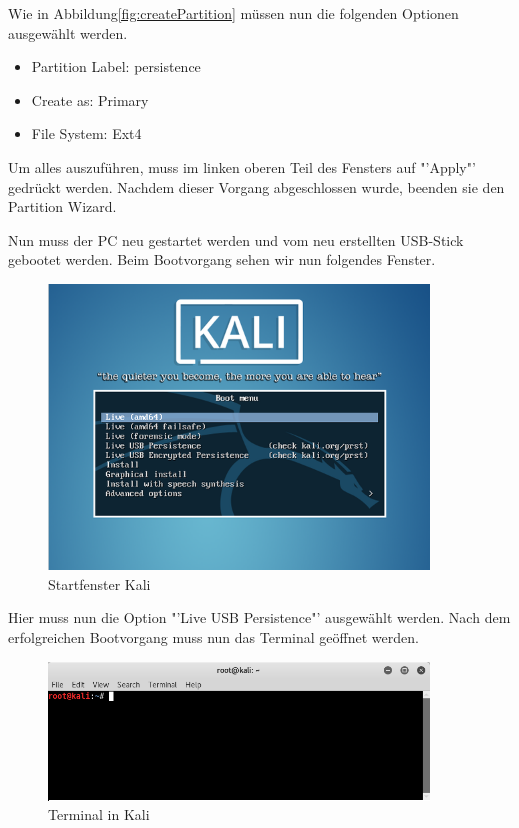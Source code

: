 Wie in Abbildung\ref{fig:createPartition} müssen nun die folgenden Optionen ausgewählt werden. 

\begin{itemize}
	\item Partition Label: persistence
	\item Create as: Primary
	\item File System: Ext4
\end{itemize}

Um alles auszuführen, muss im linken oberen Teil des Fensters auf "'Apply"' gedrückt werden.
Nachdem dieser Vorgang abgeschlossen wurde, beenden sie den Partition Wizard.

Nun muss der PC neu gestartet werden und vom neu erstellten USB-Stick gebootet werden.
Beim Bootvorgang sehen wir nun folgendes Fenster.

	\begin{figure}[H]
		\centering
		\includegraphics[width=0.9\textwidth]{images/prep/kali_start.png}
		\caption{Startfenster Kali}
		\label{fig:start kali}
	\end{figure}


Hier muss nun die Option "'Live USB Persistence"' ausgewählt werden.
Nach dem erfolgreichen Bootvorgang muss nun das Terminal geöffnet werden.

	\begin{figure}[H]
		\centering
		\includegraphics[width=0.9\textwidth]{images/prep/terminalpic.png}
		\caption{Terminal in Kali}
		\label{fig:terminal kali}
	\end{figure}

